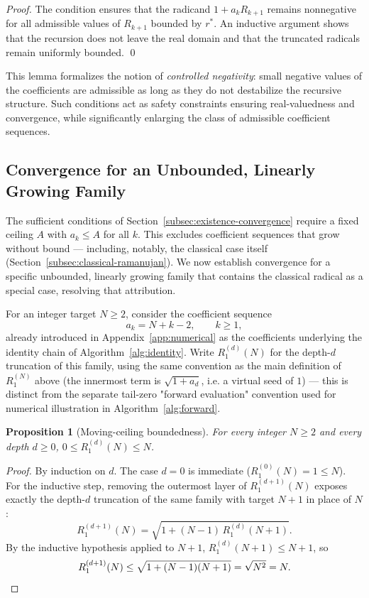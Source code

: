 \documentclass[11pt,a4paper]{amsart}
\theoremstyle{plain}
\newtheorem{proposition}[theorem]{Proposition}
\theoremstyle{definition}
\theoremstyle{remark}
\begin{document}
\begin{proof}
The condition ensures that the radicand $1 + a_k R_{k+1}$ remains nonnegative for all admissible values of $R_{k+1}$ bounded by $r^{\ast}$. An inductive argument shows that the recursion does not leave the real domain and that the truncated radicals remain uniformly bounded. \qed
\end{proof}

This lemma formalizes the notion of \emph{controlled negativity}: small negative values of the coefficients are admissible as long as they do not destabilize the recursive structure. Such conditions act as safety constraints ensuring real-valuedness and convergence, while significantly enlarging the class of admissible coefficient sequences.

\subsection{Convergence for an Unbounded, Linearly Growing Family}
\label{subsec:unbounded-linear}

The sufficient conditions of Section~\ref{subsec:existence-convergence} require a fixed ceiling $A$ with $a_k \le A$ for all $k$. This excludes coefficient sequences that grow without bound — including, notably, the classical case itself (Section~\ref{subsec:classical-ramanujan}). We now establish convergence for a specific unbounded, linearly growing family that contains the classical radical as a special case, resolving that attribution.

For an integer target $N \ge 2$, consider the coefficient sequence
\[
a_k = N + k - 2, \qquad k \ge 1,
\]
already introduced in Appendix~\ref{app:numerical} as the coefficients underlying the identity chain of Algorithm~\ref{alg:identity}. Write $R_1^{(d)}(N)$ for the depth-$d$ truncation of this family, using the same convention as the main definition of $R_1^{(N)}$ above (the innermost term is $\sqrt{1+a_d}$, i.e. a virtual seed of $1$) — this is distinct from the separate tail-zero "forward evaluation" convention used for numerical illustration in Algorithm~\ref{alg:forward}.

\begin{proposition}[Moving-ceiling boundedness]
\label{prop:moving-ceiling}
For every integer $N \ge 2$ and every depth $d \ge 0$, $0 \le R_1^{(d)}(N) \le N$.
\end{proposition}

\begin{proof}
By induction on $d$. The case $d=0$ is immediate ($R_1^{(0)}(N) = 1 \le N$). For the inductive step, removing the outermost layer of $R_1^{(d+1)}(N)$ exposes exactly the depth-$d$ truncation of the same family with target $N+1$ in place of $N$:
\[
R_1^{(d+1)}(N) = \sqrt{1+(N-1)\,R_1^{(d)}(N+1)}.
\]
By the inductive hypothesis applied to $N+1$, $R_1^{(d)}(N+1) \le N+1$, so
\[
R_1^{(d+1)}(N) \le \sqrt{1+(N-1)(N+1)} = \sqrt{N^2} = N. \qedhere
\]
\end{proof}
\end{document}

